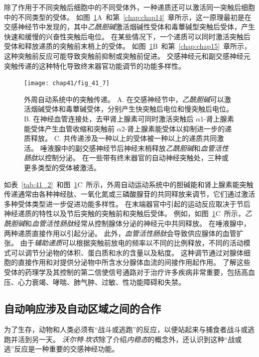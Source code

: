 除了作用于不同突触后细胞中的不同受体外，一种递质还可以激活同一突触后细胞中的不同类型的受体。
如图~\ref{fig:41_7}A~和第~\ref{chap:chap14}~章所示，这一原理最初是在交感神经节中发现的，其中\textit{乙酰胆碱}激活烟碱性受体和毒蕈碱型突触后受体，产生快速和缓慢的兴奋性突触后电位。
在某些情况下，一个递质可以同时激活突触后受体和释放递质的突触前末梢上的受体。
如图~\ref{fig:41_7}B~和第~\ref{chap:chap15}~章所示，这种突触前反应可能导致突触前抑制或突触前促进。
交感神经元和副交感神经元突触传递的这种特化导致终末器官功能调节的功能多样性。


\begin{figure}[htbp]
	\centering
	\texttt{[image: chap41/fig\_41\_7]}
	\caption{外周自动系统中的突触传递。
		A. 在交感神经节中，\textit{乙酰胆碱}可以激活烟碱受体和毒蕈碱受体，分别产生快突触后电位和慢突触后电位。
		B. 在神经血管连接处，去甲肾上腺素可同时激活突触后 $\alpha$1-肾上腺素能受体产生血管收缩和突触前 $\alpha$2-肾上腺素能受体以抑制进一步的递质释放。
		C. 共传递涉及一种以上的受体被一种以上的递质共同激活。
		唾液腺中的副交感神经节后神经末梢释放\textit{乙酰胆碱}和\textit{血管活性肠肽}以控制分泌。
		在一些带有终末器官的自动神经突触处，三种或更多类型的受体被激活。}
	\label{fig:41_7}
\end{figure}


如表~\ref{tab:41_2}~和图~\ref{fig:41_7}C~所示，外周自动运动系统中的胆碱能和肾上腺素能突触传递通常由各种神经肽、一氧化氮或三磷酸腺苷的共同释放来调节，它们通过激活多种受体类型进一步促进功能多样性。
在末端器官中引起的运动反应取决于节后神经递质的特性以及节后突触的突触前和突触后受体。
例如，如图~\ref{fig:41_7}C~所示，\textit{乙酰胆碱}和\textit{血管活性肠肽}经常从控制腺体分泌的神经元中共同释放。
在唾液腺中，两种递质直接作用以引起分泌。
此外，\textit{血管活性肠肽}会导致供应腺体的血管扩张。
由于\textit{辅助递质}可以根据突触前放电的频率以不同的比例释放，不同的活动模式可以调节分泌物的体积、蛋白质和水的含量以及粘度。
这种调节通过对腺体细胞的直接作用和对提供分泌物中所含水分腺体血流的间接作用起作用。
了解这些受体的药理学及其控制的第二信使信号通路对于治疗许多疾病非常重要，包括高血压、心力衰竭、哮喘、肺气肿、过敏、性功能障碍和失禁。



\subsection{自动响应涉及自动区域之间的合作}

为了生存，动物和人类必须有“战斗或逃跑”的反应，以便站起来与捕食者战斗或逃跑并活到另一天。
\textit{沃尔特$\cdot$坎农}除了介绍\textit{内稳态}的概念外，还认识到这种“战或逃”反应是一种重要的交感神经功能。


